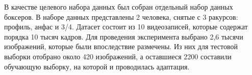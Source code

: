


В качестве целевого набора данных был собран отдельный набор данных боксеров. В наборе данных представлены 2 человека, снятые с 3 ракурсов: профиль, анфас и 3/4. Датасет состоит из 10 видеозаписей, которые содержат порядка 10 тысяч кадров. Для проведения эксперимента выбрано 2,6 тысячи изображений, которые были впоследствие размечены. Из них для тестовой выборки отобрано около 420 изображений, а оставшиеся 2200 составили обучающую выборку, на которой и проводилась адаптация.

